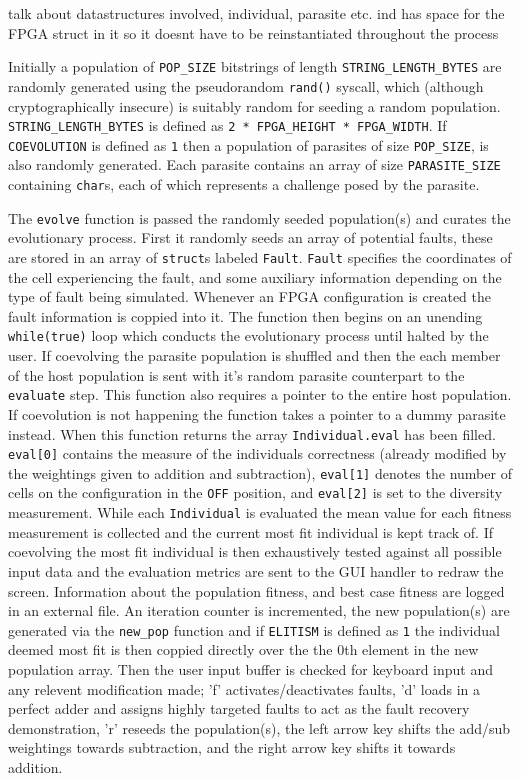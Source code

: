 \todo talk about datastructures involved, individual, parasite etc. ind has space
for the FPGA struct in it so it doesnt have to be reinstantiated throughout the
process

Initially a population of \texttt{POP\_SIZE} bitstrings of length \texttt{STRING\_LENGTH\_BYTES}
are randomly generated using the pseudorandom \texttt{rand()} syscall, which
(although cryptographically insecure) is suitably random for seeding a random
population. \texttt{STRING\_LENGTH\_BYTES} is defined as \texttt{2 * FPGA\_HEIGHT * FPGA\_WIDTH}.
If \texttt{COEVOLUTION} is defined as \texttt{1} then a population of
parasites of size \texttt{POP\_SIZE}, is also randomly generated. Each parasite
contains an array of size \texttt{PARASITE\_SIZE} containing \texttt{char}s, each of which represents a
challenge posed by the parasite.

The \texttt{evolve} function is passed the randomly seeded population(s) and
curates the evolutionary process. First it randomly seeds an array of potential
faults, these are stored in an array of \texttt{struct}s labeled \texttt{Fault}.
\texttt{Fault} specifies the coordinates of the cell experiencing the fault,
and some auxiliary information depending on the type of fault being simulated.
Whenever an FPGA configuration is created the fault information is coppied into it.
The function then begins on an unending \texttt{while(true)} loop which conducts
the evolutionary process until halted by the user. If coevolving the parasite
population is shuffled and then the each member of the host population is sent
with it's random parasite counterpart to the \texttt{evaluate} step. This function
also requires a pointer to the entire host population. If coevolution is not
happening the function takes a pointer to a dummy parasite instead. When this
function returns the array \texttt{Individual.eval} has been filled. \texttt{eval[0]}
contains the measure of the individuals correctness (already modified by the
weightings given to addition and subtraction), \texttt{eval[1]} denotes the number
of cells on the configuration in the \texttt{OFF} position, and \texttt{eval[2]}
is set to the diversity measurement. While each \texttt{Individual} is
evaluated the mean value for each fitness measurement is collected and the current
most fit individual is kept track of. If coevolving the most fit individual is then
exhaustively tested against all possible input data and the evaluation metrics
are sent to the GUI handler to redraw
the screen. Information about the population fitness, and best case fitness are
logged in an external file. An iteration counter is incremented, the new population(s)
are generated via the \texttt{new\_pop} function and if \texttt{ELITISM}
is defined as \texttt{1} the individual deemed most fit is then coppied directly over
the the 0th element in the new population array.
Then the user input buffer is checked for keyboard input and any relevent
modification made;
'f' activates/deactivates faults, 'd' loads in a perfect adder and assigns highly targeted faults
to act as the fault recovery demonstration, 'r' reseeds the population(s), the
left arrow key shifts the add/sub weightings towards subtraction, and the right
arrow key shifts it towards addition.


